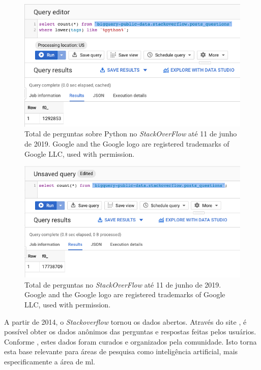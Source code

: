 \begin{figure}[h]
\includegraphics[width=12cm]{src/figuras/cap-introducao/number-python-questions-sof.png}
\caption{Total de perguntas sobre Python no \textit{StackOverFlow} até 11 de junho de 2019. Google and the Google logo are registered trademarks of Google LLC, used with permission.}
\label{fig:bigquery-total-questions-python-stackoverflow}
\end{figure}

\begin{figure}[h]
\includegraphics[width=12cm]{src/figuras/cap-introducao/number-questions-sof.png}
\caption{Total de perguntas no \textit{StackOverFlow} até 11 de junho de 2019. Google and the Google logo are registered trademarks of Google LLC, used with permission.}
\label{fig:bigquery-total-questions-stackoverflow}
\end{figure}

A partir de 2014, o \textit{Stackoverflow} tornou os dados abertos. Através do site \cite{sof-2019}, é possível obter os dados anônimos das perguntas e respostas feitas pelos usuários. Conforme \cite{Wang-quora:2013}, estes dados foram curados e organizados pela comunidade. Isto torna esta base relevante para áreas de pesquisa como inteligência artificial, mais especificamente a área de \gls{ml}. 

